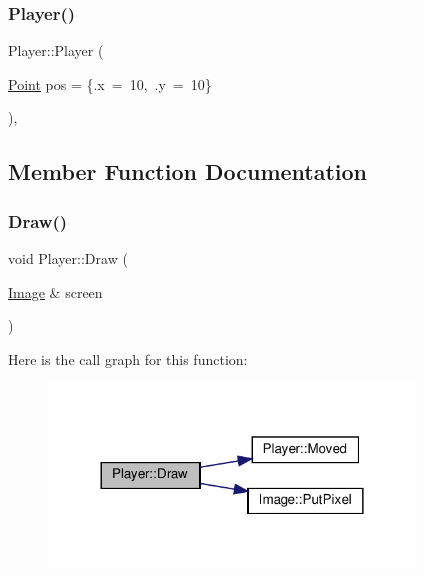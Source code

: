 \subsubsection{\texorpdfstring{Player()}{Player()}}
{\footnotesize\ttfamily Player\+::\+Player (\begin{DoxyParamCaption}\item[{\hyperlink{structPoint}{Point}}]{pos = {\ttfamily \{.x~=~10,~.y~=~10\}} }\end{DoxyParamCaption})\hspace{0.3cm}{\ttfamily [inline]}, {\ttfamily [explicit]}}



\subsection{Member Function Documentation}
\mbox{\label{structPlayer_a1a10995b61d63b46c6b562bd026382c4}} 
\subsubsection{\texorpdfstring{Draw()}{Draw()}}
{\footnotesize\ttfamily void Player\+::\+Draw (\begin{DoxyParamCaption}\item[{\hyperlink{structImage}{Image} \&}]{screen }\end{DoxyParamCaption})}

Here is the call graph for this function\+:\nopagebreak
\begin{figure}[H]
\begin{center}
\leavevmode
\includegraphics[width=276pt]{structPlayer_a1a10995b61d63b46c6b562bd026382c4_cgraph}
\end{center}
\end{figure}
\mbox{\label{structPlayer_a743da3dcbc81ed11bfcb81943aae175b}} 
